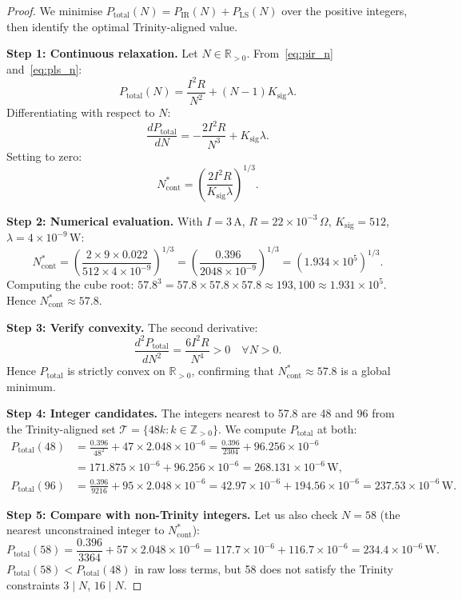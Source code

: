 \begin{proof}
We minimise $P_{\mathrm{total}}(N) = P_{\mathrm{IR}}(N) + P_{\mathrm{LS}}(N)$
over the positive integers, then identify the optimal Trinity-aligned value.

\textbf{Step 1: Continuous relaxation.}
Let $N \in \mathbb{R}_{>0}$.  From~\eqref{eq:pir_n} and~\eqref{eq:pls_n}:
\[
  P_{\mathrm{total}}(N) = \frac{I^2 R}{N^2} + (N-1) K_{\mathrm{sig}} \lambda.
\]
Differentiating with respect to $N$:
\[
  \frac{dP_{\mathrm{total}}}{dN} = -\frac{2 I^2 R}{N^3} + K_{\mathrm{sig}} \lambda.
\]
Setting to zero:
\[
  N^*_{\mathrm{cont}} = \left(\frac{2 I^2 R}{K_{\mathrm{sig}} \lambda}\right)^{1/3}.
  \tag{Q1}
\]

\textbf{Step 2: Numerical evaluation.}
With $I = 3\,\mathrm{A}$, $R = 22 \times 10^{-3}\,\Omega$,
$K_{\mathrm{sig}} = 512$, $\lambda = 4 \times 10^{-9}\,\mathrm{W}$:
\[
  N^*_{\mathrm{cont}} = \left(\frac{2 \times 9 \times 0.022}{512 \times 4 \times 10^{-9}}\right)^{1/3}
                     = \left(\frac{0.396}{2048 \times 10^{-9}}\right)^{1/3}
                     = \left(1.934 \times 10^5\right)^{1/3}.
  \tag{Q2}
\]
Computing the cube root: $57.8^3 = 57.8 \times 57.8 \times 57.8 \approx 193{,}100
\approx 1.931 \times 10^5$.  Hence $N^*_{\mathrm{cont}} \approx 57.8$.

\textbf{Step 3: Verify convexity.}
The second derivative:
\[
  \frac{d^2 P_{\mathrm{total}}}{dN^2} = \frac{6 I^2 R}{N^4} > 0 \quad \forall N > 0.
\]
Hence $P_{\mathrm{total}}$ is strictly convex on $\mathbb{R}_{>0}$, confirming that
$N^*_{\mathrm{cont}} \approx 57.8$ is a global minimum.

\textbf{Step 4: Integer candidates.}
The integers nearest to 57.8 are 48 and 96 from the Trinity-aligned set
$\mathcal{T} = \{48k : k \in \mathbb{Z}_{>0}\}$.  We compute $P_{\mathrm{total}}$
at both:
\begin{align}
  P_{\mathrm{total}}(48)
    &= \frac{0.396}{48^2} + 47 \times 2.048 \times 10^{-6}
     = \frac{0.396}{2304} + 96.256 \times 10^{-6} \\
    &= 171.875 \times 10^{-6} + 96.256 \times 10^{-6}
     = 268.131 \times 10^{-6}\,\mathrm{W},
     \tag{Q3} \\
  P_{\mathrm{total}}(96)
    &= \frac{0.396}{9216} + 95 \times 2.048 \times 10^{-6}
     = 42.97 \times 10^{-6} + 194.56 \times 10^{-6}
     = 237.53 \times 10^{-6}\,\mathrm{W}.
     \tag{Q4}
\end{align}

\textbf{Step 5: Compare with non-Trinity integers.}
Let us also check $N = 58$ (the nearest unconstrained integer to
$N^*_{\mathrm{cont}}$):
\[
  P_{\mathrm{total}}(58)
  = \frac{0.396}{3364} + 57 \times 2.048 \times 10^{-6}
  = 117.7 \times 10^{-6} + 116.7 \times 10^{-6}
  = 234.4 \times 10^{-6}\,\mathrm{W}.
  \tag{Q5}
\]
$P_{\mathrm{total}}(58) < P_{\mathrm{total}}(48)$ in raw loss terms, but 58 does
not satisfy the Trinity constraints $3 \mid N$, $16 \mid N$.


\end{proof}
